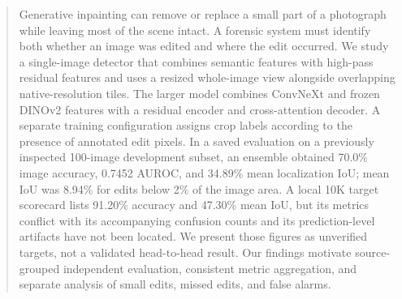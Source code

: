 \begin{abstract}
Generative inpainting can remove or replace a small part of a photograph while leaving most of the scene intact. A forensic system must identify both whether an image was edited and where the edit occurred. We study a single-image detector that combines semantic features with high-pass residual features and uses a resized whole-image view alongside overlapping native-resolution tiles. The larger model combines ConvNeXt and frozen DINOv2 features with a residual encoder and cross-attention decoder. A separate training configuration assigns crop labels according to the presence of annotated edit pixels. In a saved evaluation on a previously inspected 100-image development subset, an ensemble obtained 70.0\% image accuracy, 0.7452 AUROC, and 34.89\% mean localization IoU; mean IoU was 8.94\% for edits below 2\% of the image area. A local 10K target scorecard lists 91.20\% accuracy and 47.30\% mean IoU, but its metrics conflict with its accompanying confusion counts and its prediction-level artifacts have not been located. We present those figures as unverified targets, not a validated head-to-head result. Our findings motivate source-grouped independent evaluation, consistent metric aggregation, and separate analysis of small edits, missed edits, and false alarms.
\end{abstract}
